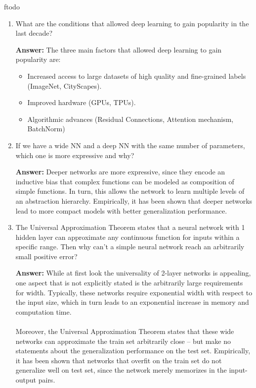 ƒtodo\documentclass{article}
\newenvironment{QandA}{\begin{enumerate}[label=\arabic*.]}{\end{enumerate}}
\newenvironment{answer}{\par\normalfont \textbf{Answer:}}{}
\begin{document}
\begin{QandA}
\begin{answer}
        (Source: \href{https://en.wikipedia.org/wiki/Minimum_description_length}{Wikipedia})
    \end{answer}

    \item What are the conditions that allowed deep learning to gain popularity in the last decade?
    \begin{answer}
        The three main factors that allowed deep learning to gain popularity are:
        \begin{itemize}
            \item Increased access to large datasets of high quality and fine-grained labels (ImageNet, CityScapes).
            \item Improved hardware (GPUs, TPUs). 
            \item Algorithmic advances (Residual Connections, Attention mechanism, BatchNorm)
        \end{itemize}
    \end{answer}

    \item If we have a wide NN and a deep NN with the same number of parameters, which one is more expressive and why?
    \begin{answer}
        Deeper networks are more expressive, since they encode an inductive bias that complex functions can be modeled as composition of simple functions. In turn, this allows the network to learn multiple levels of an abstraction hierarchy. Empirically, it has been shown that deeper networks lead to more compact models with better generalization performance. 
    \end{answer}

    \item The Universal Approximation Theorem states that a neural network with 1 hidden layer can approximate any continuous function for inputs within a specific range. Then why can’t a simple neural network reach an arbitrarily small positive error?
    \begin{answer}
        While at first look the universality of 2-layer networks is appealing, one aspect that is not explicitly stated is the arbitrarily large requirements for width. Typically, these networks require exponential width with respect to the input size, which in turn leads to an exponential increase in memory and computation time. \\\\
        Moreover, the Universal Approximation Theorem states that these wide networks can approximate the train set arbitrarily close -- but make no statements about the generalization performance on the test set. Empirically, it has been shown that networks that overfit on the train set do not generalize well on test set, since the network merely memorizes in the input-output pairs.
    \end{answer}


\end{QandA}
\end{document}
